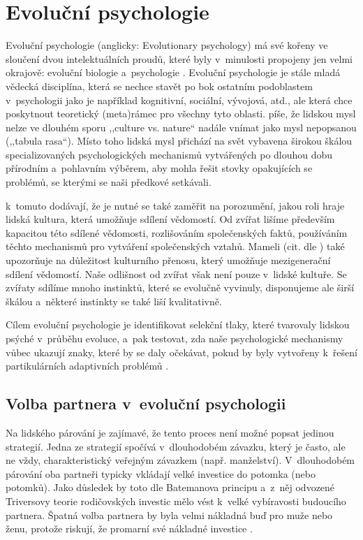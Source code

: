 \documentclass[a4paper, 12pt, notitlepage, oneside, numbers=noenddot]{report}
\begin{document}
\section{Evoluční psychologie}
Evoluční psychologie (anglicky: Evolutionary psychology) má své kořeny
ve sloučení dvou intelektuálních proudů, které byly v~minulosti
propojeny jen velmi okrajově: evoluční biologie a~psychologie
\citep{DunbarBarrett2009}.  Evoluční psychologie je stále mladá
vědecká disciplína, která se nechce stavět po bok ostatním podoblastem
v~psychologii jako je například kognitivní, sociální, vývojová, atd.,
ale která chce poskytnout teoretický (meta)rámec pro všechny tyto
oblasti.  \citet{Handbook2005} píše, že lidskou mysl nelze
ve dlouhém sporu ,,culture vs. nature`` nadále vnímat jako mysl
nepopsanou (,,tabula rasa``).  Místo toho lidská mysl přichází na svět
vybavena širokou škálou specializovaných psychologických mechanismů
vytvářených po dlouhou dobu přírodním a~pohlavním vý\-běr\-em, aby mohla
řešit stovky opakujících se problémů, se kterými se naši předkové
setkávali.

\citet{DunbarBarrett2009} k~tomuto dodávají, že je nutné se také
zaměřit na porozumění, jakou roli hraje lidská kultura, která umožňuje
sdílení vědomostí.  Od zvířat lišíme především kapacitou této sdílené
vědomosti, rozlišováním společenských faktů, používáním těchto
mechanismů pro vytváření společenských vztahů.  Mameli (cit. dle
\citealp{DunbarBarrett2009}) také upozorňuje na důležitost kulturního
přenosu, který u\-mo\-žňu\-je mezigenerační sdílení vědomostí.  Naše
odlišnost od zvířat však není pouze v~lidské kultuře.  Se zvířaty
sdílíme mnoho instinktů, které se evolučně vyvinuly, disponujeme ale
širší škálou a~některé instinkty se také liší kvalitativně.

Cílem evoluční psychologie je identifikovat selekční tlaky, které
tvarovaly lidskou psýché v~průběhu evoluce, a~pak testovat, zda naše
psychologické mechanismy vůbec ukazují znaky, které by se daly
očekávat, pokud by byly vytvořeny k~řešení partikulárních adaptivních
problémů \citep{BarrettDunbarLycett2007}.

\subsection{Volba partnera v~evoluční psychologii}

Na lidského párování je zajímavé, že tento proces není možné popsat
jedinou strategií.  Jedna ze strategií spočívá v~dlouhodobém závazku,
který je často, ale ne vždy, charakteristický veřejným závazkem
(např. manželství).  V~dlou\-ho\-do\-bém párování oba partneři typicky
vkládají velké investice do potomka (nebo potomků).  Jako důsledek by
toto dle Batemanova principu a~z~něj odvozené Triversovy teorie
rodičovských investic mělo vést k~velké vybíravosti budoucího
partnera.  Špatná volba partnera by byla velmi nákladná buď pro muže
nebo ženu, protože riskují, že promarní své nákladné investice
\citep{Buss2007}.
\end{document}
